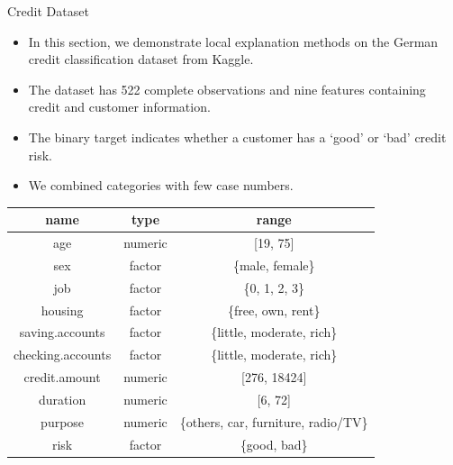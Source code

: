 \documentclass[11pt,compress,t,notes=noshow, aspectratio=169, xcolor=table]{beamer}
\begin{document}

\begin{vbframe}{Credit Dataset}

	\begin{itemize}
		\item In this section, we demonstrate local explanation methods on the German credit classification dataset from Kaggle. \href{https://www.kaggle.com/uciml/german-credit}{}
		\item The dataset has 522 complete observations and nine features containing credit and customer information.
		\item The binary target indicates whether a customer has a `good' or `bad' credit risk.  
		\item We combined categories with few case numbers. 
	\end{itemize}
		\begin{center}
			\footnotesize
			\begin{tabular}{ccc}
				\toprule
				name & type & range\\
				\midrule
				age & numeric & [19, 75]\\
				sex & factor & \{male, female\}\\
				job & factor & \{0, 1, 2, 3\}\\
				housing & factor & \{free, own, rent\}\\
				saving.accounts & factor & \{little, moderate, rich\}\\
				checking.accounts & factor & \{little, moderate, rich\}\\
				credit.amount & numeric & [276, 18424]\\
				duration & numeric &  [6, 72]\\
				purpose & numeric &  \{others, car, furniture, radio/TV\}\\
				risk & factor & \{good, bad\}\\
				\bottomrule
			\end{tabular}
		\end{center}
\end{vbframe}

\endlecture
\end{document}
